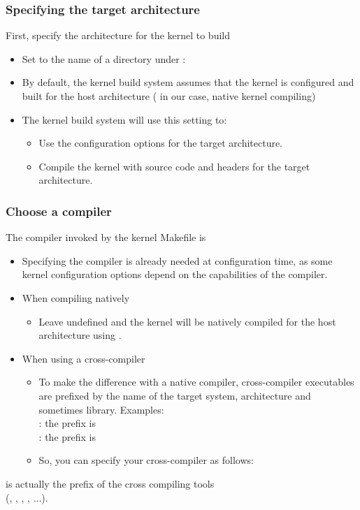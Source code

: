 \begin{frame}
  \frametitle{Specifying the target architecture}
  First, specify the architecture for the kernel to build
  \begin{itemize}
  \item Set  to the name of a directory under :\\
  \item By default, the kernel build system assumes that the
        kernel is configured and built for the host architecture
	( in our case, native kernel compiling)
  \item The kernel build system will use this setting to:
	\begin{itemize}
	\item Use the configuration options for the target
	      architecture.
	\item Compile the kernel with source code and headers
	      for the target architecture.
	\end{itemize}
  \end{itemize}
\end{frame}

\begin{frame}[fragile]
  \frametitle{Choose a compiler}
  The compiler invoked by the kernel Makefile is 
  \begin{itemize}
    \item Specifying the compiler is already needed at configuration
	  time, as some kernel configuration options depend on the
          capabilities of the compiler.
    \item When compiling natively
      \begin{itemize}
	 \item Leave  undefined and the kernel
	    will be natively compiled for the host architecture
            using .
      \end{itemize}
    \item When using a cross-compiler
      \begin{itemize}
      \item To make the difference with a native compiler, cross-compiler
          executables are prefixed by the name of the target system,
          architecture and sometimes library. Examples:\\
          \small
          : the prefix is \\
          : the prefix is 
      \item So, you can specify your cross-compiler as follows:\\
      \end{itemize}
  \end{itemize}
   is actually the prefix of the cross compiling tools\\
       (, , , , ...).
\end{frame}

